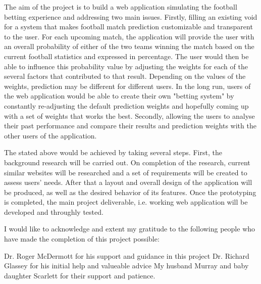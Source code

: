 \beforeabstract
{}
The aim of the project is to build a web application simulating the football betting experience and addressing two main issues. Firstly, filling an existing void for a system that makes football match prediction customizable and transparent to the user. For each upcoming match, the application will provide the user with an overall probability of either of the two teams winning the match based on the current football statistics and expressed in percentage. The user would then be able to influence this probability value by adjusting the weights for each of the several factors that contributed to that result. Depending on the values of the weights, prediction may be different for different users. In the long run, users of the web application would be able to create their own "betting system" by constantly re-adjusting the default prediction weights and hopefully coming up with a set of weights that works the best. Secondly, allowing the users to analyse their past performance and compare their results and prediction weights with the other users of the application.

The stated above would be achieved by taking several steps. First, the background research will be carried out. On completion of the research, 
current similar websites will be researched and a set of requirements will be created to assess users’ needs. After that a layout and overall design of the application will be produced, as well as the desired behavior of its features. Once the prototyping is completed, the main project deliverable, i.e. working web application will be developed and throughly tested. 


I would like to acknowledge and extent my gratitude to the following people who have made the completion of this project possible:

Dr. Roger McDermott for his support and guidance in this project
Dr. Richard Glassey for his initial help and valueable advice
My husband Murray and baby daughter Scarlett for their support and patience.

\afterpreface \afterabstract
